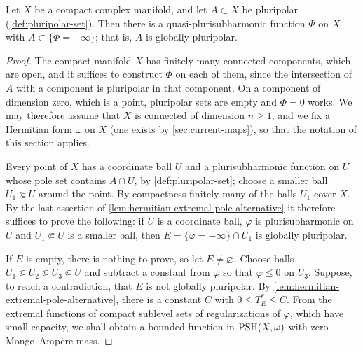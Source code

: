\begin{theorem}\label{thm:compact-complex-global-josefson}
Let $X$ be a compact complex manifold, and let $A\subset X$ be pluripolar (\cref{def:pluripolar-set}). Then there is a quasi-plurisubharmonic function $\Phi$ on $X$ with $A\subset\{\Phi=-\infty\}$; that is, $A$ is globally pluripolar.
\end{theorem}
\begin{proof}
The compact manifold $X$ has finitely many connected components, which are open, and it suffices to construct $\Phi$ on each of them, since the intersection of $A$ with a component is pluripolar in that component. On a component of dimension zero, which is a point, pluripolar sets are empty and $\Phi=0$ works. We may therefore assume that $X$ is connected of dimension $n\geq1$, and we fix a Hermitian form $\omega$ on $X$ (one exists by \cref{sec:current-maps}), so that the notation of this section applies.

Every point of $X$ has a coordinate ball $U$ and a plurisubharmonic function on $U$ whose pole set contains $A\cap U$, by \cref{def:pluripolar-set}; choose a smaller ball $U_1\Subset U$ around the point. By compactness finitely many of the balls $U_1$ cover $X$. By the last assertion of \cref{lem:hermitian-extremal-pole-alternative} it therefore suffices to prove the following: if $U$ is a coordinate ball, $\varphi$ is plurisubharmonic on $U$ and $U_1\Subset U$ is a smaller ball, then $E=\{\varphi=-\infty\}\cap U_1$ is globally pluripolar.

If $E$ is empty, there is nothing to prove, so let $E\neq\varnothing$. Choose balls $U_1\Subset U_2\Subset U_3\Subset U$ and subtract a constant from $\varphi$ so that $\varphi\leq0$ on $U_3$. Suppose, to reach a contradiction, that $E$ is not globally pluripolar. By \cref{lem:hermitian-extremal-pole-alternative}, there is a constant $C$ with $0\leq T_E^*\leq C$. From the extremal functions of compact sublevel sets of regularizations of $\varphi$, which have small capacity, we shall obtain a bounded function in $\mathrm{PSH}(X,\omega)$ with zero Monge--Amp\`ere mass.


\end{proof}

